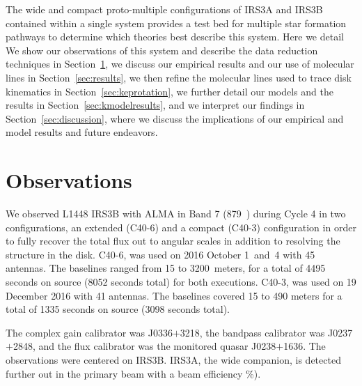 \documentclass[twocolumn, 12pt, trackchanges]{aastex63}
\begin{document}
The wide and compact proto-multiple configurations of IRS3A and IRS3B contained within a single system provides a test bed for multiple star formation pathways to determine which theories best describe this system. Here we detail  We show our observations of this system and describe the data reduction techniques in Section~\ref{sec:obs}, we discuss our empirical results and our use of molecular lines in Section~\ref{sec:results}, we then refine the molecular lines used to trace disk kinematics in Section~\ref{sec:keprotation}, we further detail our models and the results in Section~\ref{sec:kmodelresults}, and we interpret our findings in Section~\ref{sec:discussion}, where we discuss the implications of our empirical and model results and future endeavors. 

\section{Observations}\label{sec:obs}
We observed L1448 IRS3B with ALMA in Band 7 (879~\micron) during Cycle 4 in two configurations, an extended (C40-6) and a compact (C40-3) configuration in order to fully recover the total flux out to \arcsec\space angular scales in addition to resolving the structure in the disk. C40-6, was used on 2016 October 1~and~4 with 45 antennas. The baselines ranged from 15 to 3200~meters, for a total of 4495 seconds on source (8052 seconds total) for both executions. C40-3, was used on 19 December 2016 with 41 antennas. The baselines covered 15 to 490 meters for a total of 1335 seconds on source (3098 seconds total).

The complex gain calibrator was J0336$+$3218, the bandpass calibrator was J0237$+$2848, and the flux calibrator was the monitored quasar J0238$+$1636. The observations were centered on IRS3B. IRS3A, the wide companion, is detected further out in the primary beam with a beam efficiency \%).
\end{document}
